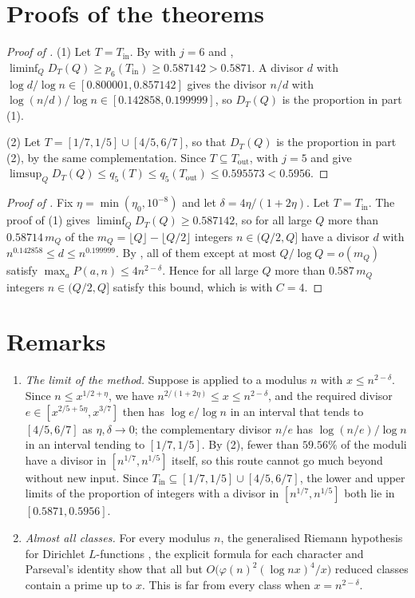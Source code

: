 \documentclass[11pt,colorlinks]{charlie}
\newcommand{\Tin}{T_{\mathrm{in}}}
\newcommand{\Tout}{T_{\mathrm{out}}}
\begin{document}
\section{Proofs of the theorems}\label{sec:proofs}
\begin{proof}[Proof of ]
(1) Let $T=\Tin$. By  with $j=6$ and , $\liminf_QD_T(Q)\ge p_6(\Tin)\ge0.587142>0.5871$. A divisor $d$ with $\log d/\log n\in[0.800001,0.857142]$ gives the divisor $n/d$ with $\log(n/d)/\log n\in[0.142858,0.199999]$, so $D_T(Q)$ is the proportion in part (1).

(2) Let $T=[1/7,1/5]\cup[4/5,6/7]$, so that $D_T(Q)$ is the proportion in part (2), by the same complementation. Since $T\subseteq\Tout$,  with $j=5$ and  give $\limsup_QD_T(Q)\le q_5(T)\le q_5(\Tout)\le0.595573<0.5956$.
\end{proof}

\begin{proof}[Proof of ]
Fix $\eta=\min(\eta_0,10^{-8})$ and let $\delta=4\eta/(1+2\eta)$. Let $T=\Tin$. The proof of (1) gives $\liminf_QD_T(Q)\ge0.587142$, so for all large $Q$ more than $0.58714\,m_Q$ of the $m_Q=\lfloor Q\rfloor-\lfloor Q/2\rfloor$ integers $n\in(Q/2,Q]$ have a divisor $d$ with $n^{0.142858}\le d\le n^{0.199999}$. By , all of them except at most $Q/\log Q=o(m_Q)$ satisfy $\max_aP(a,n)\le4n^{2-\delta}$. Hence for all large $Q$ more than $0.587\,m_Q$ integers $n\in(Q/2,Q]$ satisfy this bound, which is  with $C=4$.
\end{proof}

\section{Remarks}\label{sec:remarks}
\begin{enumerate}
\item \emph{The limit of the method.} Suppose  is applied to a modulus $n$ with $x\le n^{2-\delta}$. Since $n\le x^{1/2+\eta}$, we have $n^{2/(1+2\eta)}\le x\le n^{2-\delta}$, and the required divisor $e\in[x^{2/5+5\eta},x^{3/7}]$ then has $\log e/\log n$ in an interval that tends to $[4/5,6/7]$ as $\eta,\delta\to0$; the complementary divisor $n/e$ has $\log(n/e)/\log n$ in an interval tending to $[1/7,1/5]$. By (2), fewer than $59.56\%$ of the moduli have a divisor in $[n^{1/7},n^{1/5}]$ itself, so this route cannot go much beyond  without new input. Since $\Tin\subseteq[1/7,1/5]\cup[4/5,6/7]$, the lower and upper limits of the proportion of integers with a divisor in $[n^{1/7},n^{1/5}]$ both lie in $[0.5871,0.5956]$.
\item \emph{Almost all classes.} For every modulus $n$, the generalised Riemann hypothesis for Dirichlet $L$-functions \cite{Alpoge}, the explicit formula for each character and Parseval's identity show that all but $O\big(\varphi(n)^2(\log nx)^4/x\big)$ reduced classes contain a prime up to $x$. This is far from every class when $x=n^{2-\delta}$.
\end{enumerate}
\end{document}
